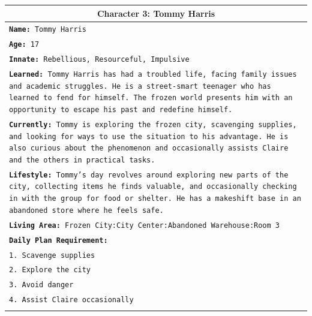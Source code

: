 \documentclass[letterpaper]{article} %
\begin{document}
\begin{small}
\begin{longtable}{p{\textwidth}}
    \multicolumn{1}{c}{\textbf{Character 3: Tommy Harris}} \\
    \midrule
    \texttt{\textbf{Name:} Tommy Harris} \\
    \texttt{\textbf{Age:} 17} \\
    \texttt{\textbf{Innate:} Rebellious, Resourceful, Impulsive} \\
    \texttt{\textbf{Learned:} Tommy Harris has had a troubled life, facing family issues and academic struggles. He is a street-smart teenager who has learned to fend for himself. The frozen world presents him with an opportunity to escape his past and redefine himself.} \\
    \texttt{\textbf{Currently:} Tommy is exploring the frozen city, scavenging supplies, and looking for ways to use the situation to his advantage. He is also curious about the phenomenon and occasionally assists Claire and the others in practical tasks.} \\
    \texttt{\textbf{Lifestyle:} Tommy's day revolves around exploring new parts of the city, collecting items he finds valuable, and occasionally checking in with the group for food or shelter. He has a makeshift base in an abandoned store where he feels safe.} \\
    \texttt{\textbf{Living Area:} Frozen City:City Center:Abandoned Warehouse:Room 3} \\
    \texttt{\textbf{Daily Plan Requirement:}} \\
    \texttt{1. Scavenge supplies} \\
    \texttt{2. Explore the city} \\
    \texttt{3. Avoid danger} \\
    \texttt{4. Assist Claire occasionally} \\
    \\
    \midrule
    

\end{longtable}
\end{small}
\end{document}
